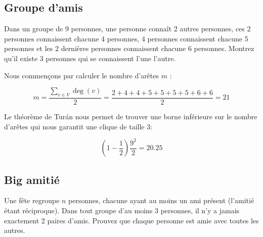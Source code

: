 \subsection{Groupe d'amis}
Dans un groupe de 9 personnes, une personne connaît 2 autres personnes, ces 2 personnes connaissent chacune 4 personnes, 4 personnes connaissent chacune 5 personnes et les 2 dernières personnes connaissent chacune 6 personnes. Montrez qu'il existe 3 personnes qui se connaissent l'une l'autre.

\begin{solution}
Nous commençons par calculer le nombre d'arêtes $m$ :

$$m=\frac{\sum_{v \in V}\deg(v)}{2}=\frac{2+4+4+5+5+5+5+6+6}{2}=21$$

Le théorème de Turán nous permet de trouver une borne inférieure sur le nombre d'arêtes qui nous garantit une clique de taille 3:

$$\left(1-\frac{1}{2}\right)\frac{9^2}{2}=20.25$$
\end{solution}

\subsection{Big amitié}
Une fête regroupe $n$ personnes, chacune ayant au moins un ami présent (l'amitié étant réciproque). Dans tout groupe d'au moins 3 personnes, il n'y a jamais exactement 2 paires d'amis. Prouvez que chaque personne est amie avec toutes les autres.

